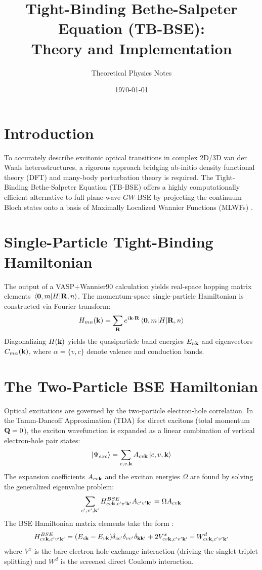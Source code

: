 \documentclass[12pt,a4paper]{article}
\title{Tight-Binding Bethe-Salpeter Equation (TB-BSE):\\ Theory and Implementation}
\author{Theoretical Physics Notes}
\date{\today}
\begin{document}
\maketitle

\section{Introduction}
To accurately describe excitonic optical transitions in complex 2D/3D van der Waals heterostructures, a rigorous approach bridging ab-initio density functional theory (DFT) and many-body perturbation theory is required. The Tight-Binding Bethe-Salpeter Equation (TB-BSE) offers a highly computationally efficient alternative to full plane-wave $GW$-BSE by projecting the continuum Bloch states onto a basis of Maximally Localized Wannier Functions (MLWFs) \cite{Marzari1997, Mostofi2008}.

\section{Single-Particle Tight-Binding Hamiltonian}
The output of a VASP+Wannier90 calculation yields real-space hopping matrix elements $\matrixel{\vb{0}, m}{H}{\vb{R}, n}$. The momentum-space single-particle Hamiltonian is constructed via Fourier transform:
\begin{equation}
    H_{mn}(\vb{k}) = \sum_{\vb{R}} e^{i \vb{k} \cdot \vb{R}} \matrixel{\vb{0}, m}{H}{\vb{R}, n}
\end{equation}
Diagonalizing $H(\vb{k})$ yields the quasiparticle band energies $E_{n\vb{k}}$ and eigenvectors $C_{m\alpha}(\vb{k})$, where $\alpha = \{v, c\}$ denote valence and conduction bands. 

\section{The Two-Particle BSE Hamiltonian}
Optical excitations are governed by the two-particle electron-hole correlation. In the Tamm-Dancoff Approximation (TDA) for direct excitons (total momentum $\vb{Q} = 0$), the exciton wavefunction is expanded as a linear combination of vertical electron-hole pair states:
\begin{equation}
    \ket{\Psi_{exc}} = \sum_{c, v, \vb{k}} A_{cv\vb{k}} \ket{c, v, \vb{k}}
\end{equation}
The expansion coefficients $A_{cv\vb{k}}$ and the exciton energies $\Omega$ are found by solving the generalized eigenvalue problem:
\begin{equation}
    \sum_{c', v', \vb{k}'} H^{BSE}_{cv\vb{k}, c'v'\vb{k}'} A_{c'v'\vb{k}'} = \Omega A_{cv\vb{k}}
\end{equation}
The BSE Hamiltonian matrix elements take the form \cite{Strinati1988, Rohlfing1998, Wu2015}:
\begin{equation}
    H^{BSE}_{cv\vb{k}, c'v'\vb{k}'} = (E_{c\vb{k}} - E_{v\vb{k}})\delta_{cc'}\delta_{vv'}\delta_{\vb{k}\vb{k}'} + 2V^x_{cv\vb{k}, c'v'\vb{k}'} - W^d_{cv\vb{k}, c'v'\vb{k}'}
\end{equation}
where $V^x$ is the bare electron-hole exchange interaction (driving the singlet-triplet splitting) and $W^d$ is the screened direct Coulomb interaction.
\end{document}
